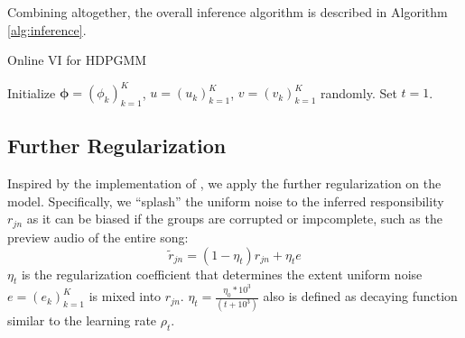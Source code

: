 \documentclass{article}
\begin{document}
Combining altogether, the overall inference algorithm is described in Algorithm \ref{alg:inference}.

\begin{algorithm}
\caption{Online VI for HDPGMM}\label{alg:inference}
Initialize $\mathbf{\phi}=(\phi_{k})^{K}_{k=1}$, $u=(u_{k})^{K}_{k=1}$, $v=(v_{k})^{K}_{k=1}$ randomly. Set $t=1$.\\
\end{algorithm}

\subsection{Further Regularization}\label{sec:hdpgmm:regularization}

Inspired by the implementation of \cite{DBLP:journals/jmlr/WangPB11, 10.1214/06-BA104}, we apply the further regularization on the model. Specifically, we ``splash'' the uniform noise to the inferred responsibility $r_{jn}$ as it can be biased if the groups are corrupted or impcomplete, such as the preview audio of the entire song:
\begin{equation}
    \tilde{r}_{jn} = (1 - \eta_{t}) r_{jn} + \eta_{t} e
\end{equation}
$\eta_{t}$ is the regularization coefficient that determines the extent uniform noise $e = (e_{k})_{k=1}^{K}$ is mixed into $r_{jn}$. $\eta_{t} = \frac{\eta_{0} * 10^{3}}{(t + 10^{3})}$ also is defined as decaying function similar to the learning rate $\rho_{t}$.



\end{document}

